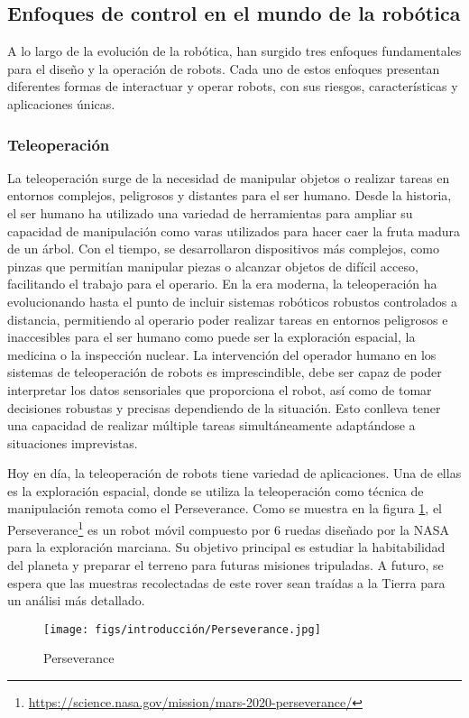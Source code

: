  \subsection{Enfoques de control en el mundo de la robótica}
 \label{sec:enfoquesrobotica}
A lo largo de la evolución de la robótica, han surgido tres enfoques fundamentales para el diseño y la operación de robots. Cada uno de estos enfoques presentan diferentes
formas de interactuar y operar robots, con sus riesgos, características y aplicaciones únicas. 
\subsubsection{Teleoperación}
\label{sec:subseccion}

La teleoperación surge de la necesidad de manipular objetos o realizar tareas en entornos complejos, peligrosos y distantes para el ser humano. Desde la historia, el ser humano
ha utilizado una variedad de herramientas para ampliar su capacidad de manipulación como varas utilizados para hacer caer la fruta madura de un árbol. Con el tiempo, se desarrollaron 
dispositivos más complejos, como pinzas que permitían manipular piezas o alcanzar objetos de difícil acceso, facilitando el trabajo para el operario. En la era moderna, la teleoperación
ha evolucionando hasta el punto de incluir sistemas robóticos robustos controlados a distancia, permitiendo al operario poder realizar
tareas en entornos peligrosos e inaccesibles para el ser humano como puede ser la exploración espacial, la medicina o la inspección nuclear.
La intervención del operador humano en los sistemas de teleoperación de robots es imprescindible, debe ser capaz de poder interpretar los datos sensoriales que proporciona el robot, así como de 
tomar decisiones robustas y precisas dependiendo de la situación. Esto conlleva tener una capacidad de realizar múltiple tareas simultáneamente adaptándose a situaciones imprevistas.

Hoy en día, la teleoperación de robots tiene variedad de aplicaciones. Una de ellas es la exploración espacial, donde se utiliza la teleoperación
como técnica de manipulación remota como el Perseverance. Como se muestra en la figura \ref{fig:Perseverance}, el Perseverance\footnote{\url{https://science.nasa.gov/mission/mars-2020-perseverance/}} 
es un robot móvil compuesto por 6 ruedas diseñado por la NASA para la exploración marciana. Su objetivo principal es estudiar la habitabilidad del planeta y preparar el terreno para futuras misiones 
tripuladas. A futuro, se espera que las muestras recolectadas de este rover sean traídas a la Tierra para un análisi más detallado.
\begin{figure} [H]
  \begin{center}
    \texttt{[image: figs/introducción/Perseverance.jpg]}
  \end{center}
  \caption{Perseverance}
  \label{fig:Perseverance}
  \vspace{-1.5em}
\end{figure}


